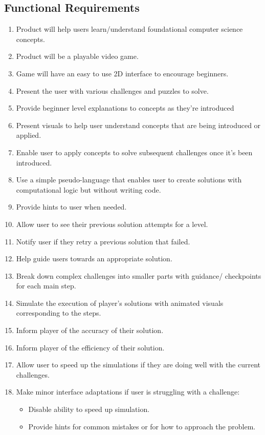 \subsection{Functional Requirements}
\begin{enumerate}
  \item Product will help users learn/understand foundational computer science
  concepts.
  \item Product will be a playable video game.
  \item Game will have an easy to use 2D interface to encourage beginners.
  \item Present the user with various challenges and puzzles to solve.
  \item Provide beginner level explanations to concepts as they’re introduced
  \item Present visuals to help user understand concepts that are being
  introduced or applied.
  \item Enable user to apply concepts to solve subsequent challenges once it’s
  been introduced.
  \item Use a simple pseudo-language that enables user to create solutions with
  computational logic but without writing code.
  \item Provide hints to user when needed.
  \item Allow user to see their previous solution attempts for a level.
  \item Notify user if they retry a previous solution that failed.
  \item Help guide users towards an appropriate solution.
  \item Break down complex challenges into smaller parts with guidance/
  checkpoints for each main step.
  \item Simulate the execution of player’s solutions with animated visuals
  corresponding to the steps.
  \item Inform player of the accuracy of their solution.
  \item Inform player of the efficiency of their solution.
  \item Allow user to speed up the simulations if they are doing well with the
  current challenges.
  \item Make minor interface adaptations if user is struggling with a challenge:
  \begin{itemize}
    \item Disable ability to speed up simulation.
    \item Provide hints for common mistakes or for how to approach the problem.

\end{itemize}
\end{enumerate}

